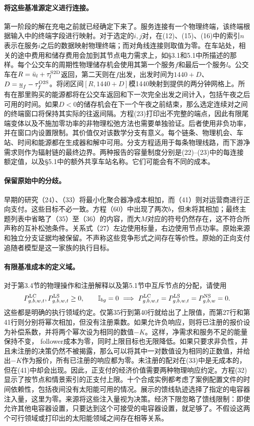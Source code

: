\documentclass{article}
\begin{document}
\paragraph{将这些基准源定义进行连接。}
第一阶段的解在充电之前就已经确定下来了。服务连接有一个物理终端，该终端根据输入中的终端字段进行映射。对于选定的\(i,j\)对，在(12)、(15)、(16)中的索引\(n\)表示在服务\(i\)之后的数据映射物理终端；而对角线连接则取值为零。在车站处，相关的途中费用和储存费用会加到其节点电力需求上，如§3.1和5.1中所描述的那样。每个公交车的周期性物理储存机会使用其第一个服务\(f\)和最后一个服务\(l\)。公交车在\(R=\bar u_l+\tau^{\rm S2D}_l\)返回，第二天则在\(f\)出发，出发时间为\(1440+D\)、\(D=\underline u_f-\tau_f^{\rm O2S}\)。将闭区间\([R,1440+D]\)模1440映射到提供的两分钟网格上。所有在那里购买的能源都将在公交车返回和下一次完全出发之间计入，包括午夜之后可用的时间。如果\(D<0\)的储存机会在下一个午夜之前结束，那么选定连续对之间的终端窗口将保持其实际的往返间隔。方程(23)打印出不完整的端点，因此有限尾端变体以及不施加零功率的非物理松弛方法也需要单独验证。后者使用非负功率，并在窗口内设置限制。其价值仅对该数学分支有意义。每个链条、物理机会、车站、时间和能源都在生成器和解中可用。分支方程适用于每条物理线路，而下游净需求则作为辐射链的最终边界。两种报告的容量制度分别是(22)--(23)中的每连接额定值，以及§5.1中的额外共享车站名称。它们可能会有不同的成本。

\paragraph{保留原始中的分歧。}
早期的研究（24）、（33）将最小化聚合器净成本相加，而（41）则对运营商进行正向支付。这些目标不必一致。方程（60）中出现了两次\(b\)，但未将其相加；最终主题列表中省略了（35）至（36）的内容，而大\(M\)对应的符号仍然存在，这不符合所声称的互补松弛条件。关系式（27）左边使用标量，右边使用节点功率。原始来源和独立分支证据均被保留。不声称这些竞争形式之间存在等价性。原始的正向支付追随者模型是这一家族的执行目标。

\paragraph{有限基准成本的定义域。}
对于第3.4节的物理操作和注册解释以及第5.1节中互斥节点的分配，请使用
\[
 P^{\rm LC}_{g,b,w,t},P^{\rm LS}_{g,b,w,t}\ge0,\qquad
 \mathbb I_{bg}=0\ \Longrightarrow\ 
 P^{\rm LC}_{g,b,w,t}=P^{\rm LS}_{g,b,w,t}=P^{\rm NS}_{g,b,w}=0 .
\]
这些都是明确的执行领域约定。仅第35行到第40行就给出了上限值，而第27行和第41行则分别将幂次相加，但没有注册乘数。如果允许负响应，则将已注册的报价设为补偿系数，并将两个幂次设为相同的数值\(-K\)。这样，净需求和服务不足的能量保持不变， follower成本为零，同时上限目标也无限降低。如果只要求非负性，并且未注册的决策仍然不被揭露，那么可以将其中一对数值设为相同的正数值，并给出\(-K\)作为报价，所有已注册的响应都为零。未注册的配对在(33)中是无成本的，但在(41)中却会出现。因此，正支付的经济价值需要两种物理响应约定。方程(32)显示了按节点和情景索引的正支付上限。十个合成实例都考虑了案例配置文件的时间依赖性，包括夜间没有太阳能可用的情况。展示的馈线轨迹选择了指定的电容器注入量，这里为零。来源将这些注入量视为决策。经济下限忽略了馈线限制：即使允许其他电容器设置，只要达到这个可接受的电容器设置，就足够了。不假设这两个可行领域或打印出的太阳能领域之间存在相等关系。
\end{document}
